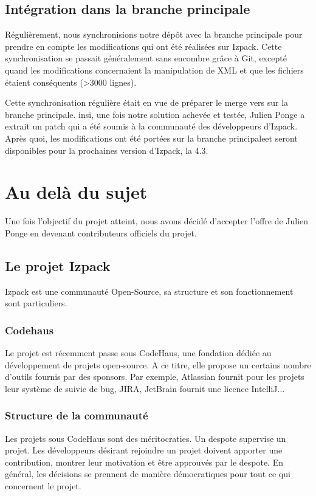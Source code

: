 \subsection{Intégration dans la branche principale}
Régulièrement, nous synchronisions notre dépôt avec la branche principale pour prendre en compte les modifications qui ont été réalisées sur Izpack.
Cette synchronisation se passait généralement sans encombre grâce à Git, excepté quand les modifications concernaient la manipulation de XML et que les fichiers étaient conséquents (>3000 lignes).

Cette synchronisation régulière était en vue de préparer le merge vers sur la branche principale.
insi, une fois notre solution achevée et testée, Julien Ponge a extrait un patch qui a été soumis à la communauté des développeurs d'Izpack.
Après quoi, les modifications ont été portées sur la branche principaleet seront disponibles pour la prochaines version d'Izpack, la 4.3.

\section{Au delà du sujet}
Une fois l'objectif du projet atteint, nous avons décidé d'accepter l'offre de Julien Ponge en devenant contributeurs officiels du projet.
\subsection{Le projet Izpack}
Izpack est une communauté Open-Source, sa structure et son fonctionnement sont particuliers.
\subsubsection{Codehaus}
Le projet est récemment passe sous CodeHaus, une fondation dédiée au développement de projets open-source.
A ce titre, elle propose un certains nombre d'outils fournis par des sponsors.
Par exemple, Atlassian fournit pour les projets leur système de suivie de bug, JIRA, JetBrain fournit une licence IntelliJ...
\subsubsection{Structure de la communauté}
Les projets sous CodeHaus sont des méritocraties. Un despote supervise un projet.
Les développeurs désirant rejoindre un projet doivent apporter une contribution, montrer leur motivation et être approuvés par le despote.
En général, les décisions se prennent de manière démocratiques pour tout ce qui concernent le projet.

